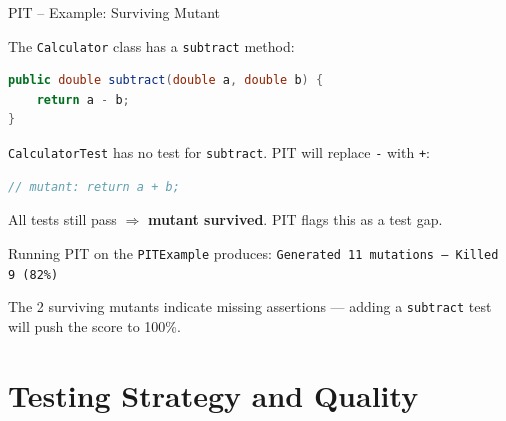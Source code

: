 \documentclass[11pt, xcolor=svgnames]{beamer}
\providecommand{\alert}[1]{\textbf{#1}}
\begin{document}

\begin{frame}[fragile]{PIT -- Example: Surviving Mutant}

The \texttt{Calculator} class has a \texttt{subtract} method:

\begin{lstlisting}[language=Java,basicstyle=\scriptsize]
public double subtract(double a, double b) {
    return a - b;
}
\end{lstlisting}

\texttt{CalculatorTest} has no test for \texttt{subtract}. PIT will replace \texttt{-} with \texttt{+}:

\begin{lstlisting}[language=Java,basicstyle=\scriptsize]
// mutant: return a + b;
\end{lstlisting}

All tests still pass $\Rightarrow$ \alert{mutant survived}. PIT flags this as a test gap.

Running PIT on the \texttt{PITExample} produces:
\texttt{Generated 11 mutations --- Killed 9 (82\%)}

The 2 surviving mutants indicate missing assertions ---
adding a \texttt{subtract} test will push the score to 100\%.

\end{frame}


\section{Testing Strategy and Quality}

\end{document}

